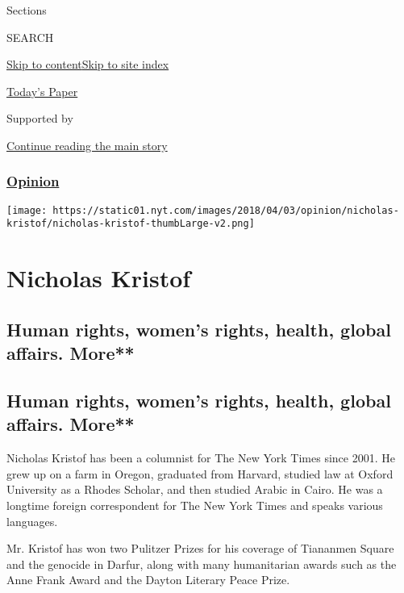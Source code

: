 Sections

SEARCH

\protect\hyperlink{site-content}{Skip to
content}\protect\hyperlink{site-index}{Skip to site index}

\href{https://myaccount.nytimes.com/auth/login?response_type=cookie\&client_id=vi}{}

\href{https://www.nytimes.com/section/todayspaper}{Today's Paper}

Supported by

\protect\hyperlink{after-sponsor}{Continue reading the main story}

\hypertarget{opinion}{%
\subsubsection{\texorpdfstring{\href{/section/opinion}{Opinion}}{Opinion}}\label{opinion}}

\texttt{[image: https://static01.nyt.com/images/2018/04/03/opinion/nicholas-kristof/nicholas-kristof-thumbLarge-v2.png]}

\hypertarget{nicholas-kristof}{%
\section{Nicholas Kristof}\label{nicholas-kristof}}

\hypertarget{human-rights-womens-rights-health-global-affairs-more}{%
\subsection{Human rights, women's rights, health, global affairs.
More**}\label{human-rights-womens-rights-health-global-affairs-more}}

\hypertarget{human-rights-womens-rights-health-global-affairs-more-1}{%
\subsection{Human rights, women's rights, health, global affairs.
More**}\label{human-rights-womens-rights-health-global-affairs-more-1}}

Nicholas Kristof has been a columnist for The New York Times since 2001.
He grew up on a farm in Oregon, graduated from Harvard, studied law at
Oxford University as a Rhodes Scholar, and then studied Arabic in Cairo.
He was a longtime foreign correspondent for The New York Times and
speaks various languages.

Mr. Kristof has won two Pulitzer Prizes for his coverage of Tiananmen
Square and the genocide in Darfur, along with many humanitarian awards
such as the Anne Frank Award and the Dayton Literary Peace Prize.

